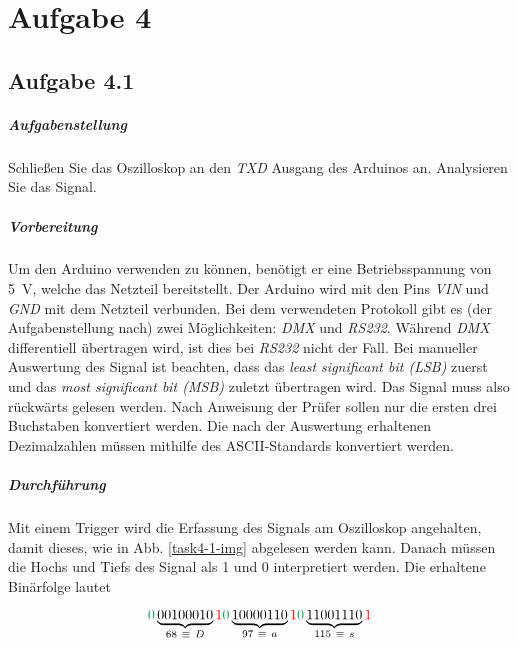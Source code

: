 \chapter{Aufgabe 4}
\section{Aufgabe 4.1}
\paragraph{Aufgabenstellung}
Schließen Sie das Oszilloskop an den \textit{TXD} Ausgang des Arduinos an. Analysieren Sie das Signal.

\paragraph{Vorbereitung}
Um den Arduino verwenden zu können, benötigt er eine Betriebsspannung von \SI{5}{V}, welche das Netzteil bereitstellt. Der Arduino wird mit den Pins \textit{VIN} und \textit{GND} mit dem Netzteil verbunden. Bei dem verwendeten Protokoll gibt es (der Aufgabenstellung nach) zwei Möglichkeiten: \textit{DMX} und \textit{RS232}. Während \textit{DMX} differentiell übertragen wird, ist dies bei \textit{RS232} nicht der Fall. Bei manueller Auswertung des Signal ist beachten, dass das \textit{least significant bit (LSB)} zuerst und das \textit{most significant bit (MSB)} zuletzt übertragen wird. Das Signal muss also \glqq{}rückwärts\grqq{} gelesen werden. Nach Anweisung der Prüfer sollen nur die ersten drei Buchstaben konvertiert werden. Die nach der Auswertung erhaltenen Dezimalzahlen müssen mithilfe des ASCII-Standards konvertiert werden.

\paragraph{Durchführung}
Mit einem Trigger wird die Erfassung des Signals am Oszilloskop angehalten, damit dieses, wie in Abb. \vref{task4-1-img} abgelesen werden kann. Danach müssen die Hochs und Tiefs des Signal als 1 und 0 interpretiert werden. Die erhaltene Binärfolge lautet

\begin{equation*}
	\textcolor{ForestGreen}{0}\underbrace{00100010}_{68 \ \equiv \ D}\textcolor{red}{1}
	\textcolor{ForestGreen}{0}\underbrace{10000110}_{97 \ \equiv \ a}\textcolor{red}{1}
	\textcolor{ForestGreen}{0}\underbrace{11001110}_{115 \ \equiv \ s}\textcolor{red}{1}
\end{equation*}\\

